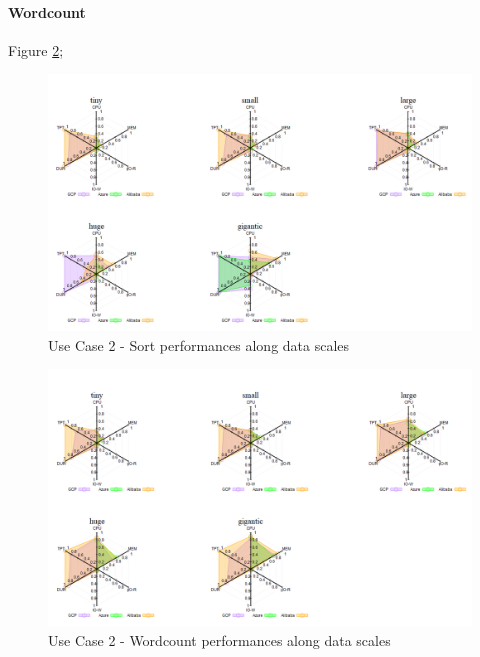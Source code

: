 \documentclass[review]{elsarticle}
\begin{document}
\paragraph{Wordcount} Figure \ref{fig:uc2-wrdcnt}; 


\begin{figure}[b]
	\includegraphics[width=\textwidth]{uc2-srt}
	\caption{Use Case 2 - Sort performances along data scales}
	\label{fig:uc2-srt}
	\centering
\end{figure}

\begin{figure}[b]
	\includegraphics[width=\textwidth]{uc2-wrdcnt}
	\caption{Use Case 2 - Wordcount performances along data scales}
	\label{fig:uc2-wrdcnt}
	\centering
\end{figure}
\end{document}
